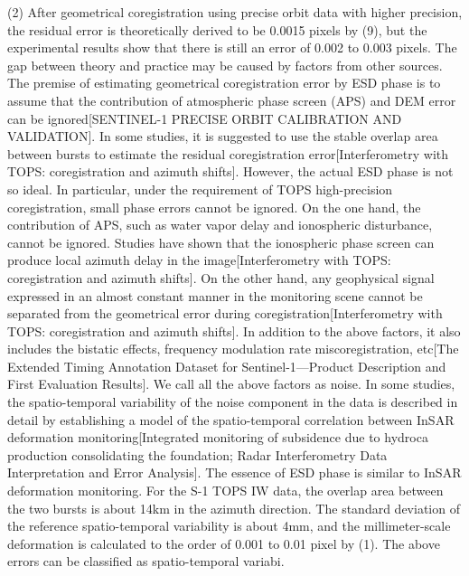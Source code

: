 \documentclass[a4paper,fleqn]{cas-dc}
\begin{document}
(2) After geometrical coregistration using precise orbit data with higher precision, the residual error is theoretically derived to be 0.0015 pixels by (9), but the experimental results show that there is still an error of 0.002 to 0.003 pixels. The gap between theory and practice may be caused by factors from other sources. The premise of estimating geometrical coregistration error by ESD phase is to assume that the contribution of atmospheric phase screen (APS) and DEM error can be ignored[SENTINEL-1 PRECISE ORBIT CALIBRATION AND VALIDATION]. In some studies, it is suggested to use the stable overlap area between bursts to estimate the residual coregistration error[Interferometry with TOPS: coregistration and azimuth shifts]. However, the actual ESD phase is not so ideal. In particular, under the requirement of TOPS high-precision coregistration, small phase errors cannot be ignored. On the one hand, the contribution of APS, such as water vapor delay and ionospheric disturbance, cannot be ignored. Studies have shown that the ionospheric phase screen can produce local azimuth delay in the image[Interferometry with TOPS: coregistration and azimuth shifts]. On the other hand, any geophysical signal expressed in an almost constant manner in the monitoring scene cannot be separated from the geometrical error during coregistration[Interferometry with TOPS: coregistration and azimuth shifts]. In addition to the above factors, it also includes the bistatic effects, frequency modulation rate miscoregistration, etc[The Extended Timing Annotation Dataset for Sentinel-1—Product Description and First Evaluation Results]. We call all the above factors as noise. In some studies, the spatio-temporal variability of the noise component in the data is described in detail by establishing a model of the spatio-temporal correlation between InSAR deformation monitoring[Integrated monitoring of subsidence due to hydroca production consolidating the foundation; Radar Interferometry Data Interpretation and Error Analysis]. The essence of ESD phase is similar to InSAR deformation monitoring. For the S-1 TOPS IW data, the overlap area between the two bursts is about 14km in the azimuth direction. The standard deviation of the reference spatio-temporal variability is about 4mm, and the millimeter-scale deformation is calculated to the order of 0.001 to 0.01 pixel by (1). The above errors can be classified as spatio-temporal variabi. \par
\end{document}
